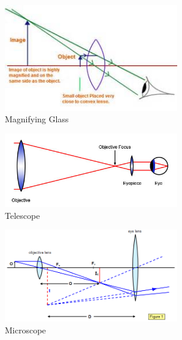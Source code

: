 \begin{figure}
  \centering
  \includegraphics[width=3.0in]{fig/magnifying_glass.png}
  \caption{Magnifying Glass}\label{fig_magnifying_glass}
\end{figure}

\begin{figure}
  \centering
  \includegraphics[width=3.0in]{fig/telescope.png}
  \caption{Telescope}\label{fig_telescope}
\end{figure}

\begin{figure}
  \centering
  \includegraphics[width=3.0in]{fig/microscope.png}
  \caption{Microscope}\label{fig_microscope}
\end{figure}
